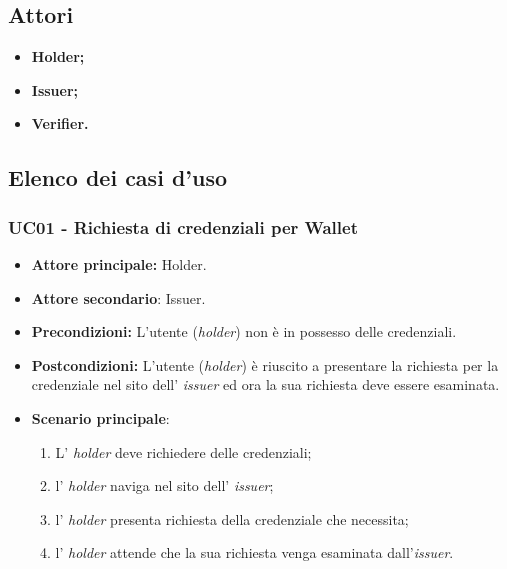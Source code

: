 \subsection{Attori}
\begin{itemize}
    \item\textbf{Holder;}
    \item\textbf{Issuer;}
    \item\textbf{Verifier.}
\end{itemize}

\subsection{Elenco dei casi d'uso}
\subsubsection{UC01 - Richiesta di credenziali per Wallet}
\begin{itemize}
\item \textbf{Attore principale:} Holder.
\item \textbf{Attore secondario}: Issuer. 
\item \textbf{Precondizioni:} L’utente (\textit{holder}) non è in possesso delle credenziali.
\item \textbf{Postcondizioni:} L’utente (\textit{holder}) è riuscito a presentare la richiesta per la credenziale nel sito dell’ \textit{issuer} ed ora la sua richiesta deve essere esaminata.
\item \textbf{Scenario principale}: 
    \begin{enumerate}
        \item L' \textit{holder} deve richiedere delle credenziali; 
        \item l' \textit{holder} naviga nel sito dell' \textit{issuer}; 
        \item l' \textit{holder} presenta richiesta della credenziale che necessita; 
        \item l' \textit{holder} attende che la sua richiesta venga esaminata dall'\textit{issuer}.
    \end{enumerate}
\end{itemize}

